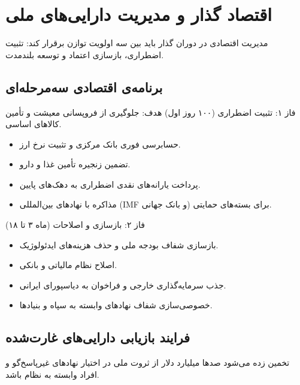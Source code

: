 \chapter{اقتصاد گذار و مدیریت دارایی‌های ملی}
\label{app:economy}

مدیریت اقتصادی در دوران گذار باید بین سه اولویت توازن برقرار کند: تثبیت اضطراری، بازسازی اعتماد و توسعه بلندمدت.

\section{برنامه‌ی اقتصادی سه‌مرحله‌ای}

\begin{modernbox}{فاز ۱: تثبیت اضطراری (۱۰۰ روز اول)}
هدف: جلوگیری از فروپسانی معیشت و تأمین کالاهای اساسی.
\begin{itemize}
    \item حسابرسی فوری بانک مرکزی و تثبیت نرخ ارز.
    \item تضمین زنجیره تأمین غذا و دارو.
    \item پرداخت یارانه‌های نقدی اضطراری به دهک‌های پایین.
    \item مذاکره با نهادهای بین‌المللی (IMF و بانک جهانی) برای بسته‌های حمایتی.
\end{itemize}
\end{modernbox}

\begin{modernbox}{فاز ۲: بازسازی و اصلاحات (ماه ۳ تا ۱۸)}
\begin{itemize}
    \item بازسازی شفاف بودجه ملی و حذف هزینه‌های ایدئولوژیک.
    \item اصلاح نظام مالیاتی و بانکی.
    \item جذب سرمایه‌گذاری خارجی و فراخوان به دیاسپورای ایرانی.
    \item خصوصی‌سازی شفاف نهادهای وابسته به سپاه و بنیادها.
\end{itemize}
\end{modernbox}

\section{فرایند بازیابی دارایی‌های غارت‌شده}

تخمین زده می‌شود صدها میلیارد دلار از ثروت ملی در اختیار نهادهای غیرپاسخ‌گو و افراد وابسته به نظام باشد.

